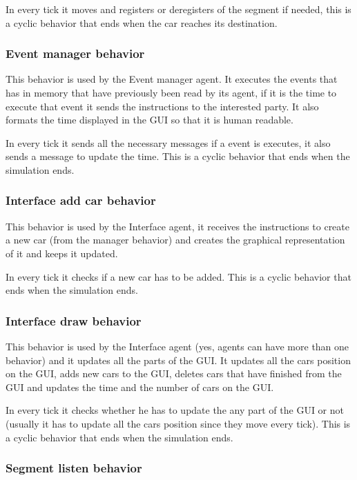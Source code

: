 In every tick it moves and registers or deregisters of the segment if needed, this is a cyclic behavior that ends when the car reaches its destination.

\subsubsection{Event manager behavior}

This behavior is used by the Event manager agent. It executes the events that has in memory that have previously been read by its agent, if it is the time to execute that event it sends the instructions to the interested party. It also formats the time displayed in the GUI so that it is human readable.

In every tick it sends all the necessary messages if a event is executes, it also sends a message to update the time. This is a cyclic behavior that ends when the simulation ends.

\subsubsection{Interface add car behavior}

This behavior is used by the Interface agent, it receives the instructions to create a new car (from the manager behavior) and creates the graphical representation of it and keeps it updated.

In every tick it checks if a new car has to be added. This is a cyclic behavior that ends when the simulation ends.

\subsubsection{Interface draw behavior}

This behavior is used by the Interface agent (yes, agents can have more than one behavior) and it updates all the parts of the GUI. It updates all the cars position on the GUI, adds new cars to the GUI, deletes cars that have finished from the GUI and updates the time and the number of cars on the GUI.

In every tick it checks whether he has to update the any part of the GUI or not (usually it has to update all the cars position since they move every tick). This is a cyclic behavior that ends when the simulation ends.

\subsubsection{Segment listen behavior}

